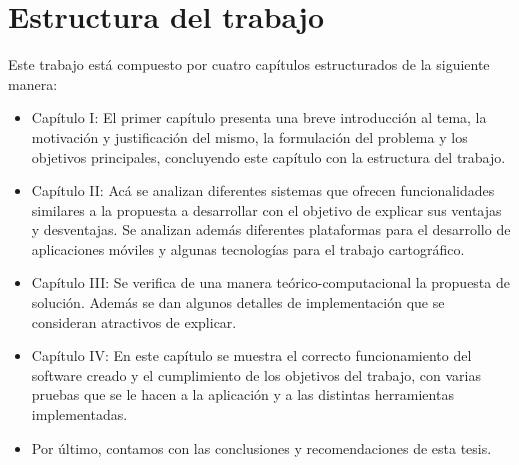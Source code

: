 \section{Estructura del trabajo}
Este trabajo está compuesto por cuatro capítulos estructurados de la siguiente
manera:
\begin{itemize}
      \item Capítulo I: El primer capítulo presenta una breve introducción al tema, la
            motivación y justificación del mismo, la formulación del problema y los objetivos
            principales, concluyendo este capítulo con la estructura del trabajo.
      \item Capítulo II: Acá se analizan diferentes sistemas que ofrecen funcionalidades
            similares a la propuesta a desarrollar con el objetivo de explicar sus ventajas y
            desventajas. Se analizan además diferentes plataformas para el desarrollo de
            aplicaciones móviles y algunas tecnologías para el trabajo cartográfico.
      \item Capítulo III: Se verifica de una manera teórico-computacional la propuesta de
            solución. Además se dan algunos detalles de implementación que se consideran
            atractivos de explicar.
      \item Capítulo IV: En este capítulo se muestra el correcto funcionamiento del software
            creado y el cumplimiento de los objetivos del trabajo, con varias pruebas que se le
            hacen a la aplicación y a las distintas herramientas implementadas.
      \item Por último, contamos con las conclusiones y recomendaciones de esta tesis.
\end{itemize}

